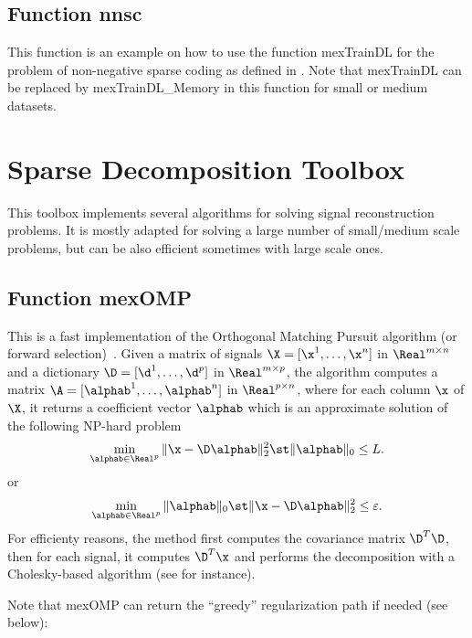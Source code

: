 \documentclass[a4paper, 11pt]{article}
\begin{document}
{\footnotesize

}

\subsection{Function nnsc}
This function is an example on how to use the function mexTrainDL for the
problem of non-negative sparse coding as defined in \cite{hoyer}.  Note that
mexTrainDL can be replaced by mexTrainDL\_Memory in this function for small or
medium datasets.

{\footnotesize

}


\section{Sparse Decomposition Toolbox}
This toolbox implements several algorithms for solving signal reconstruction problems. It is mostly adapted for solving a large number of small/medium scale problems, but can be also efficient sometimes with large scale ones.
\subsection{Function mexOMP}
This is a fast implementation of the Orthogonal Matching Pursuit algorithm (or forward selection)~\cite{mallat4,weisberg}. Given a matrix of signals $\X=[\x^1,\ldots,\x^n]$  in $\Real^{m \times n}$ and a dictionary $\D=[\d^1,\ldots,\d^p]$ in $\Real^{m \times p}$, the algorithm computes a matrix $\A=[\alphab^1,\ldots,\alphab^n]$ in $\Real^{p \times n}$,
where for each column $\x$ of $\X$, it returns a coefficient vector $\alphab$ which is an approximate solution of the following NP-hard problem
\begin{equation}
   \min_{\alphab \in \Real^p} \|\x-\D\alphab\|_2^2 \st \|\alphab\|_0 \leq L.
\end{equation}
or 
\begin{equation}
   \min_{\alphab \in \Real^p}  \|\alphab\|_0 \st \|\x-\D\alphab\|_2^2 \leq \varepsilon.
\end{equation}
For efficienty reasons, the method first computes the covariance matrix
$\D^T\D$, then for each signal, it computes $\D^T\x$ and performs the
decomposition with a Cholesky-based algorithm (see \cite{cotter} for instance).

Note that mexOMP can return the ``greedy'' regularization path if needed (see below):
{\footnotesize

}
\end{document}
